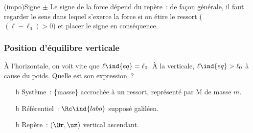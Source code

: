 \documentclass[../../main/main.tex]{subfiles}
\begin{document}
\begin{tcb*}(impo){Signe $\pm$}
	Le signe de la force dépend du repère~: de façon générale, il faut
	regarder le sens dans lequel s’exerce la force si on étire le ressort ($(\ell
		- \ell_0) > 0$) et placer le signe en conséquence.
\end{tcb*}

\subsubsection{Position d'équilibre verticale}
\noindent
\begin{minipage}{0.75\linewidth}
	À l'horizontale, on voit vite que $\ell\ind{eq} = \ell_0$. À la verticale,
	$\ell\ind{eq} > \ell_0$ à cause du poids. Quelle est son expression~?
	\begin{enumerate}[label=\sqenumi]
		\item[b]{Système}~: \{masse\} accrochée à un ressort, représenté par M de masse
		      $m$.
		\item[b]{Référentiel}~: $\Rc\ind{labo}$ supposé galiléen.
		\item[b]{Repère}~: $(\Or, \uz)$ vertical ascendant.
	\end{enumerate}
\end{minipage}
\hfill
\end{document}
